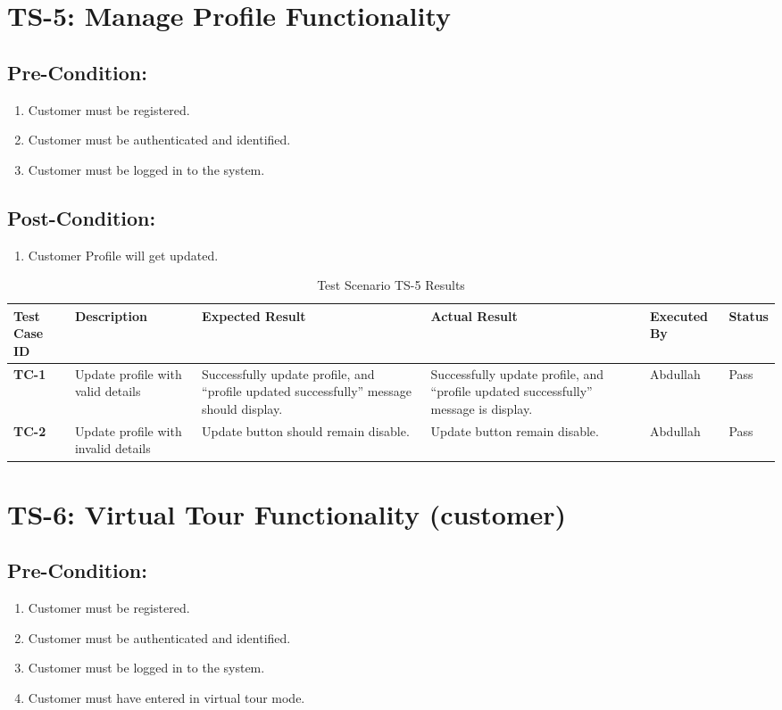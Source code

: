 \section{TS-5: Manage Profile Functionality}
\subsection{Pre-Condition:}
\begin{enumerate}
  \item Customer must be registered.
  \item Customer must be authenticated and identified.
  \item Customer must be logged in to the system.
\end{enumerate}
\subsection{Post-Condition:}
\begin{enumerate}
  \item Customer Profile will get updated.
\end{enumerate}

\begin{table}[H]
    \centering
   \begin{tabular}{ | m{1cm} | m{2.3cm}| m{3cm} | m{3cm} | m{1.7cm} | m{1.3cm} |}  
  \hline  \textbf{Test Case ID} &  \textbf{Description} &  \textbf{Expected Result} &  \textbf{Actual Result} &  \textbf{Executed By} &  \textbf{Status}  \\  \hline
  \textbf{TC-1} & Update profile with valid details & Successfully update profile, and “profile updated successfully” message should display. & Successfully update profile, and “profile updated successfully” message is display. & Abdullah & Pass
  \\  \hline
  \textbf{TC-2} & Update profile with invalid details & Update button should remain disable. & Update button remain disable. & Abdullah & Pass
  \\  \hline
  
\end{tabular}
    \caption{Test Scenario TS-5 Results}
    \label{tab: Test Scenario TS-5 Results}
\end{table}

\section{TS-6: Virtual Tour Functionality (customer)}
\subsection{Pre-Condition:}
\begin{enumerate}
  \item Customer must be registered.
  \item Customer must be authenticated and identified.
  \item Customer must be logged in to the system.
  \item Customer must have entered in virtual tour mode.
\end{enumerate}

